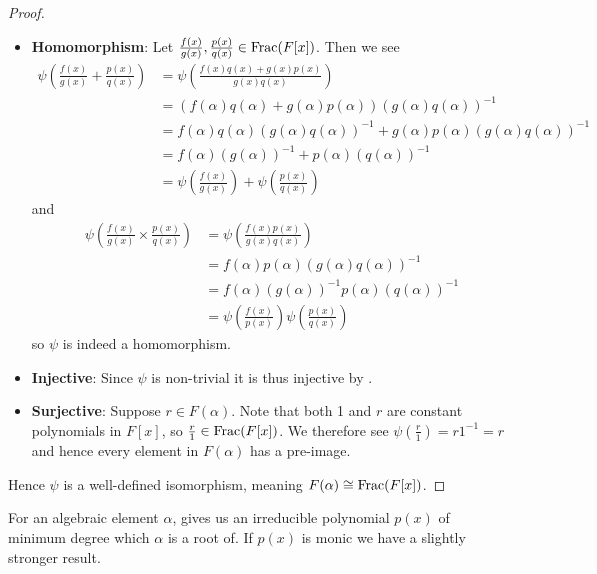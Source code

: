 \begin{proof}
\begin{itemize}
        \item \textbf{Homomorphism}: Let $\frac{f(x)}{g(x)}, \frac{p(x)}{q(x)} \in \mathrm{Frac}(F[x])$. Then we see
        \begin{align*}
            \psi\left(\frac{f(x)}{g(x)} + \frac{p(x)}{q(x)}\right) &= \psi\left(\frac{f(x)q(x) + g(x)p(x)}{g(x)q(x)}\right)\\
            &= \left(f(\alpha)q(\alpha) + g(\alpha)p(\alpha)\right)\left(g(\alpha)q(\alpha)\right)^{-1}\\
            &= f(\alpha)q(\alpha)\left(g(\alpha)q(\alpha)\right)^{-1} + g(\alpha)p(\alpha)\left(g(\alpha)q(\alpha)\right)^{-1}\\
            &= f(\alpha)(g(\alpha))^{-1} + p(\alpha)(q(\alpha))^{-1}\\
            &= \psi\left(\frac{f(x)}{g(x)}\right) + \psi\left(\frac{p(x)}{q(x)}\right)
        \end{align*}
        and
        \begin{align*}
            \psi\left(\frac{f(x)}{g(x)}\times \frac{p(x)}{q(x)}\right) &= \psi\left(\frac{f(x)p(x)}{g(x)q(x)}\right)\\
            &= f(\alpha)p(\alpha)\left(g(\alpha)q(\alpha)\right)^{-1}\\
            &= f(\alpha)(g(\alpha))^{-1}p(\alpha)(q(\alpha))^{-1}\\
            &= \psi\left(\frac{f(x)}{p(x)}\right)\psi\left(\frac{p(x)}{q(x)}\right)
        \end{align*}
        so $\psi$ is indeed a homomorphism.
        
        \item \textbf{Injective}: Since $\psi$ is non-trivial it is thus injective by .
        
        \item \textbf{Surjective}: Suppose $r \in F(\alpha)$. Note that both  1 and $r$ are constant polynomials in $F[x]$, so $\frac r1 \in \mathrm{Frac}(F[x])$. We therefore see $\psi\left(\frac r1\right) = r1^{-1} = r$ and hence every element in $F(\alpha)$ has a pre-image.
    \end{itemize}
    Hence $\psi$ is a well-defined isomorphism, meaning $F(\alpha) \cong \mathrm{Frac}(F[x])$.
\end{proof}

For an algebraic element $\alpha$,  gives us an irreducible polynomial $p(x)$ of minimum degree which $\alpha$ is a root of. If $p(x)$ is monic we have a slightly stronger result.

